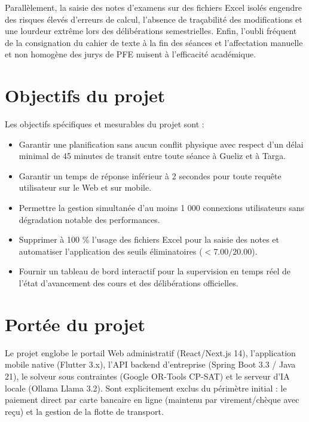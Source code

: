 \documentclass[11pt,a4paper]{report}
\begin{document}
Parallèlement, la saisie des notes d'examens sur des fichiers Excel isolés engendre des risques élevés d'erreurs de calcul, l'absence de traçabilité des modifications et une lourdeur extrême lors des délibérations semestrielles. Enfin, l'oubli fréquent de la consignation du cahier de texte à la fin des séances et l'affectation manuelle et non homogène des jurys de PFE nuisent à l'efficacité académique.

\section{Objectifs du projet}
Les objectifs spécifiques et mesurables du projet sont :
\begin{itemize}[leftmargin=1.5cm]
    \item Garantir une planification sans aucun conflit physique avec respect d'un délai minimal de 45 minutes de transit entre toute séance à Gueliz et à Targa.
    \item Garantir un temps de réponse inférieur à 2 secondes pour toute requête utilisateur sur le Web et sur mobile.
    \item Permettre la gestion simultanée d'au moins 1 000 connexions utilisateurs sans dégradation notable des performances.
    \item Supprimer à 100 \% l'usage des fichiers Excel pour la saisie des notes et automatiser l'application des seuils éliminatoires ($< 7.00/20.00$).
    \item Fournir un tableau de bord interactif pour la supervision en temps réel de l'état d'avancement des cours et des délibérations officielles.
\end{itemize}

\section{Portée du projet}
Le projet englobe le portail Web administratif (React/Next.js 14), l'application mobile native (Flutter 3.x), l'API backend d'entreprise (Spring Boot 3.3 / Java 21), le solveur sous contraintes (Google OR-Tools CP-SAT) et le serveur d'IA locale (Ollama Llama 3.2). Sont explicitement exclus du périmètre initial : le paiement direct par carte bancaire en ligne (maintenu par virement/chèque avec reçu) et la gestion de la flotte de transport.

\end{document}
